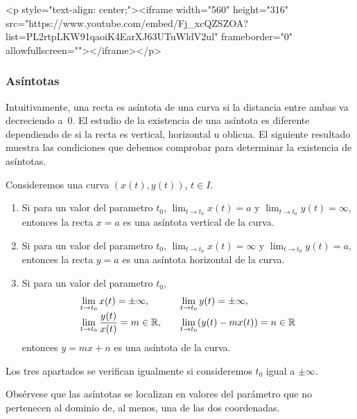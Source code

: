 \begin{rawhtml}
<p style="text-align: center;"><iframe width="560" height="316" src="https://www.youtube.com/embed/Fj_xcQZSZOA?list=PL2rtpLKW91qaoiK4EarXJ63UTuWldV2ul" frameborder="0" allowfullscreen=""></iframe></p>
\end{rawhtml}

\subsubsection{Asíntotas}\label{sec:asintotas}
Intuitivamente, una recta es asíntota de una curva si la distancia entre ambas va decreciendo a~0.
El estudio de la existencia de una asíntota es diferente dependiendo de si la recta es vertical, horizontal u oblicua.
El siguiente resultado muestra las condiciones que debemos comprobar para determinar la existencia de asíntotas.

\begin{proposicion}
Consideremos una curva $(x(t),y(t))$, $t\in I$.
\begin{enumerate}
\item
Si para un valor del parametro $t_0$, $\displaystyle\lim_{t\to t_0}x(t)=a$ y $\displaystyle\lim_{t\to t_0}y(t)=\infty$, entonces la recta $x=a$ es una asíntota vertical de la curva.
\item
Si para un valor del parametro $t_0$, $\displaystyle\lim_{t\to t_0}x(t)=\infty$ y $\displaystyle\lim_{t\to t_0}y(t)=a$, entonces la recta $y=a$ es una asíntota horizontal de la curva.
\item
Si para un valor del parametro $t_0$,
\[
\begin{array}{l@{\qquad}l}
\displaystyle\lim_{t\to t_0}x(t)=\pm\infty, &
\displaystyle\lim_{t\to t_0}y(t)=\pm\infty, \\
\displaystyle\lim_{t\to t_0}\dfrac{y(t)}{x(t)}=m\in\mathbb{R}, &
\displaystyle\lim_{t\to t_0}(y(t)-mx(t))=n\in\mathbb{R}
\end{array}
\]
entonces $y=mx+n$ es una asíntota de la curva.
\end{enumerate}
Los tres apartados se verifican igualmente si consideremos $t_0$ igual a $\pm\infty$.
\end{proposicion}
%
Obsérvese que las asíntotas se localizan en valores del parámetro que no pertenecen al dominio de, al menos, una de las dos coordenadas.

